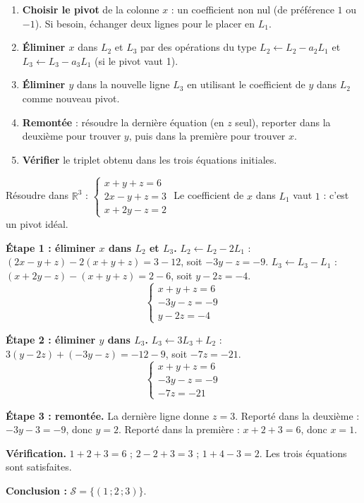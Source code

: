 \documentclass[11pt]{article}
\begin{document}
\begin{methode}
\begin{enumerate}
\item \textbf{Choisir le pivot} de la colonne $x$ : un coefficient non nul (de préférence $1$ ou $-1$). Si besoin, échanger deux lignes pour le placer en $L_1$.
\item \textbf{Éliminer $x$} dans $L_2$ et $L_3$ par des opérations du type $L_2 \leftarrow L_2 - a_2 L_1$ et $L_3 \leftarrow L_3 - a_3 L_1$ (si le pivot vaut 1).
\item \textbf{Éliminer $y$} dans la nouvelle ligne $L_3$ en utilisant le coefficient de $y$ dans $L_2$ comme nouveau pivot.
\item \textbf{Remontée} : résoudre la dernière équation (en $z$ seul), reporter dans la deuxième pour trouver $y$, puis dans la première pour trouver $x$.
\item \textbf{Vérifier} le triplet obtenu dans les trois équations initiales.
\end{enumerate}
\end{methode}

\begin{exoresolu}
Résoudre dans $\mathbb{R}^3$ : $\begin{cases} x + y + z = 6 \\ 2x - y + z = 3 \\ x + 2y - z = 2 \end{cases}$
\tcblower
Le coefficient de $x$ dans $L_1$ vaut $1$ : c'est un pivot idéal.

\textbf{Étape 1 : éliminer $x$ dans $L_2$ et $L_3$.}
$L_2 \leftarrow L_2 - 2L_1$ : $(2x - y + z) - 2(x + y + z) = 3 - 12$, soit $-3y - z = -9$.
$L_3 \leftarrow L_3 - L_1$ : $(x + 2y - z) - (x + y + z) = 2 - 6$, soit $y - 2z = -4$.
\[
\begin{cases}
x + y + z = 6 \\
-3y - z = -9 \\
y - 2z = -4
\end{cases}
\]

\textbf{Étape 2 : éliminer $y$ dans $L_3$.}
$L_3 \leftarrow 3L_3 + L_2$ : $3(y - 2z) + (-3y - z) = -12 - 9$, soit $-7z = -21$.
\[
\begin{cases}
x + y + z = 6 \\
-3y - z = -9 \\
-7z = -21
\end{cases}
\]

\textbf{Étape 3 : remontée.} La dernière ligne donne $z = 3$. Reporté dans la deuxième : $-3y - 3 = -9$, donc $y = 2$. Reporté dans la première : $x + 2 + 3 = 6$, donc $x = 1$.

\textbf{Vérification.} $1 + 2 + 3 = 6$ ; $2 - 2 + 3 = 3$ ; $1 + 4 - 3 = 2$. Les trois équations sont satisfaites.

\textbf{Conclusion :} $\mathcal{S} = \{(1\,;2\,;3)\}$.
\end{exoresolu}
\end{document}
